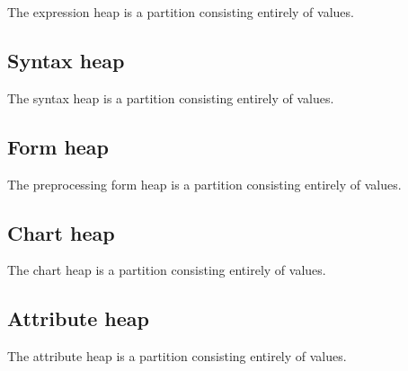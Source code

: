 The expression heap is a partition consisting entirely of  values.



\subsection{Syntax heap}
\label{sec:ifc-syntax-heap}

The syntax heap is a partition consisting entirely of  values.


\subsection{Form heap}
\label{sec:ifc-form-heap}

The preprocessing form heap is a partition consisting entirely of  values.




\subsection{Chart heap}
\label{sec:ifc-chart-heap}

The chart heap is a partition consisting entirely of  values.


\subsection{Attribute heap}
\label{sec:ifc-attr-heap}


The attribute heap is a partition consisting entirely of  values.

